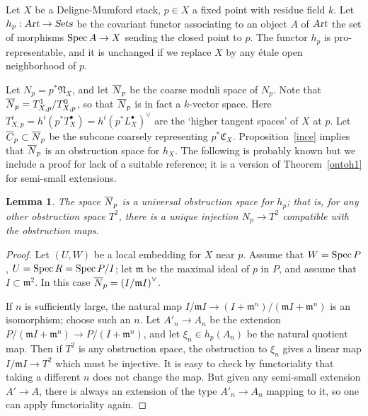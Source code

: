 \documentclass[11pt]{article}
\theoremstyle{plain}
\newtheorem{lem}[prop]{Lemma}
\theoremstyle{definition}
\newenvironment{pf}{\begin{proof}}{\end{proof}}
\newcommand{\dual}[1]{{{#1}^{\vee}}}
\newcommand{\upst}{^{\ast}}
\newcommand{\com}{^{\scriptscriptstyle\bullet}}
\newcommand{\NN}{{\mathfrak{N}}}
\newcommand{\Mm}{{\mathfrak{m}}}
\newcommand{\CC}{{\mathfrak{C}}}
\newcommand{\spec}{\mathop{\rm Spec}\nolimits}
\theoremstyle{plain}
\theoremstyle{definition}
\theoremstyle{remark}
\begin{document}
Let \(X\) be a Deligne-Mumford stack, \(p\in X\) a fixed point with
residue field \(k\).  Let \(h_p:\hbox{\sl Art}\to \hbox{\sl Sets}\) be the covariant functor
associating to an object \(A\) of \(\hbox{\sl Art}\) the set of morphisms \(\spec
A\to X\) sending the closed point to \(p\). The functor \(h_p\) is
pro-representable, and it is unchanged if we replace \(X\) by any \'etale
open neighborhood of \(p\).

Let \(N_p=p^*\NN_X\), and let \(\overline{ N}_p\) be the coarse moduli space of
\(N_p\). Note that \(\overline{ N}_p =T^1_{X,p}/T^0_{X,p}\), so that \(\overline{ N}_p\) is in
fact a \(k\)-vector space. Here \(T^i_{X,p}=h^i(p\upst
T_X\com)=\dual{h^i(p\upst L_X\com)}\) are the `higher tangent spaces'
of \(X\) at \(p\). Let \(\overline{ C}_p\subset \overline{ N}_p\) be the subcone coarsely
representing \(p\upst\CC_X\). Proposition~\ref{ince} implies that \(\overline{ N}_p\)
is an obstruction space for \(h_X\). The following is probably known but
we include a proof for lack of a suitable reference; it is a version
of Theorem~\ref{ontoh1} for semi-small extensions.

\begin{lem} The space \(\overline{ N}_p\) is a universal
obstruction space for \(h_p\); that is, for any other obstruction space \(T^2\),
there is a unique injection
\(N_p\to T^2\) compatible with the obstruction maps.
\end{lem}
\begin{pf} Let \((U,W)\) be a local embedding
for \(X\) near
\(p\). Assume that \(W=\spec P\), \(U=\spec R=\spec P/I\); let \(\Mm\) be the maximal
ideal of \(p\) in \(P\), and assume that \(I\subset \Mm^2\). In this case
\(\nor=\dual{(I/\Mm I)}\).

If \(n\) is sufficiently large, the natural map
\(I/\Mm I\to (I+\Mm^n)/(\Mm I+\Mm^n)\) is an isomorphism; choose such an \(n\). Let
\(A'_n\to A_n\) be the extension \(P/(\Mm I+\Mm^n)\to P/(I+\Mm^n)\), and let
\(\xi_n\in h_p(A_n)\) be the natural quotient map. Then if \(T^2\) is any
obstruction space, the obstruction to \(\xi_n\) gives a linear map \(I/\Mm I\to
T^2\) which must be injective. It is easy to check by functoriality that taking
a
different \(n\) does not change the map. But given any semi-small extension
\(A'\to
A\), there is always an extension of the type \(A'_n\to A_n\) mapping to it, so
one
can apply functoriality again.
\end{pf}
\end{document}

